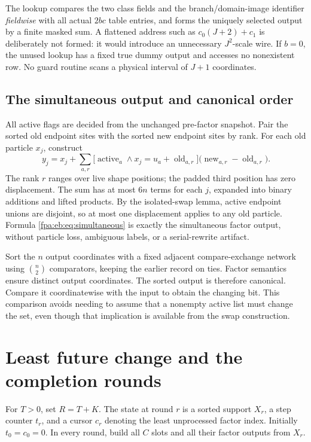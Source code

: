 \documentclass[11pt,a4paper]{article}
\numberwithin{equation}{section}
\begin{document}
The lookup compares the two class fields and the branch/domain-image identifier \emph{fieldwise} with all actual $2bc$ table entries, and forms the uniquely selected output by a finite masked sum. A flattened address such as $c_0(J+2)+c_1$ is deliberately not formed: it would introduce an unnecessary $J^2$-scale wire. If $b=0$, the unused lookup has a fixed true dummy output and accesses no nonexistent row. No guard routine scans a physical interval of $J+1$ coordinates.

\subsection{The simultaneous output and canonical order}
All active flags are decided from the unchanged pre-factor snapshot. Pair the sorted old endpoint sites with the sorted new endpoint sites by rank. For each old particle $x_j$, construct
\begin{equation}\label{fpa:eb:eq:simultaneous}
y_j=x_j+\sum_{a,r}
\bigl[\operatorname{active}_a\wedge x_j=u_a+\operatorname{old}_{a,r}\bigr]
\bigl(\operatorname{new}_{a,r}-\operatorname{old}_{a,r}\bigr).
\end{equation}
The rank $r$ ranges over live shape positions; the padded third position has zero displacement. The sum has at most $6n$ terms for each $j$, expanded into binary additions and lifted products. By the isolated-swap lemma, active endpoint unions are disjoint, so at most one displacement applies to any old particle. Formula \eqref{fpa:eb:eq:simultaneous} is exactly the simultaneous factor output, without particle loss, ambiguous labels, or a serial-rewrite artifact.

Sort the $n$ output coordinates with a fixed adjacent compare-exchange network using $\binom n2$ comparators, keeping the earlier record on ties. Factor semantics ensure distinct output coordinates. The sorted output is therefore canonical. Compare it coordinatewise with the input to obtain the changing bit. This comparison avoids needing to assume that a nonempty active list must change the set, even though that implication is available from the swap construction.

\section{Least future change and the completion rounds}\label{fpa:eb:sec:scheduler}
For $T>0$, set $R=T+K$. The state at round $r$ is a sorted support $X_r$, a step counter $t_r$, and a cursor $c_r$ denoting the least unprocessed factor index. Initially $t_0=c_0=0$. In every round, build all $C$ slots and all their factor outputs from $X_r$.
\end{document}
